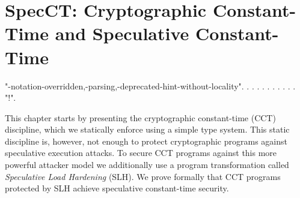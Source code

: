 \documentclass[12pt]{report}
\begin{document}

\begin{coqdoccode}
\end{coqdoccode}
\section{SpecCT: Cryptographic Constant-Time and Speculative Constant-Time}


\begin{coqdoccode}
\coqdocemptyline
\coqdocnoindent
{}  "-notation-overridden,-parsing,-deprecated-hint-without-locality".\coqdoceol
\coqdocnoindent
{}    .\coqdoceol
\coqdocnoindent
{}    .\coqdoceol
\coqdocnoindent
{}    .\coqdoceol
\coqdocnoindent
{}    .\coqdoceol
\coqdocnoindent
{}    .\coqdoceol
\coqdocnoindent
{}    .  .\coqdoceol
\coqdocnoindent
{}    .\coqdoceol
\coqdocnoindent
{}    .  .\coqdoceol
\coqdocnoindent
{}    "!".\coqdoceol
\coqdocemptyline
\end{coqdoccode}
This chapter starts by presenting the cryptographic constant-time (CCT)
    discipline, which we statically enforce using a simple type system. This
    static discipline is, however, not enough to protect cryptographic programs
    against speculative execution attacks. To secure CCT programs against this
    more powerful attacker model we additionally use a program transformation
    called \textit{Speculative Load Hardening} (SLH). We prove formally that CCT
    programs protected by SLH achieve speculative constant-time security. 
\begin{coqdoccode}
\coqdocemptyline
\end{coqdoccode}
\end{document}
